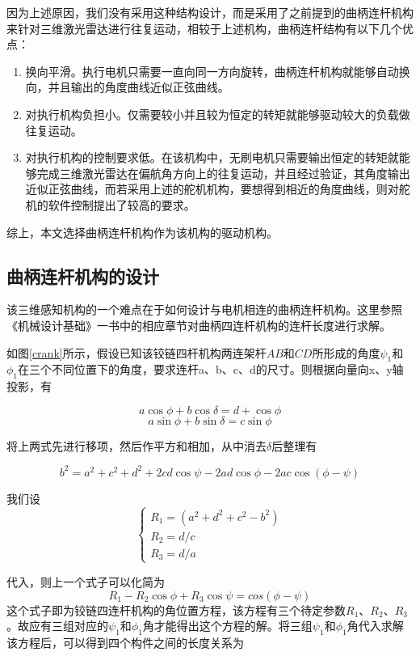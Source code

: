 因为上述原因，我们没有采用这种结构设计，而是采用了之前提到的曲柄连杆机构来针对三维激光雷达进行往复运动，相较于上述机构，曲柄连杆结构有以下几个优点：
\begin{enumerate}
    \item 换向平滑。执行电机只需要一直向同一方向旋转，曲柄连杆机构就能够自动换向，并且输出的角度曲线近似正弦曲线。
    \item 对执行机构负担小。仅需要较小并且较为恒定的转矩就能够驱动较大的负载做往复运动。
    \item 对执行机构的控制要求低。在该机构中，无刷电机只需要输出恒定的转矩就能够完成三维激光雷达在偏航角方向上的往复运动，并且经过验证，其角度输出近似正弦曲线，而若采用上述的舵机机构，要想得到相近的角度曲线，则对舵机的软件控制提出了较高的要求。
\end{enumerate}

综上，本文选择曲柄连杆机构作为该机构的驱动机构。

\subsection{曲柄连杆机构的设计}
该三维感知机构的一个难点在于如何设计与电机相连的曲柄连杆机构。这里参照《机械设计基础》一书中的相应章节对曲柄四连杆机构的连杆长度进行求解。

如图\ref{crank}所示，假设已知该铰链四杆机构两连架杆$AB$和$CD$所形成的角度$\psi_1$和$\phi_1$在三个不同位置下的角度，要求连杆a、b、c、d的尺寸。则根据向量向x、y轴投影，有

$$a\cos\phi + b\cos\delta = d + \cos\phi$$
$$a\sin\phi + b\sin\delta = c\sin\phi$$

将上两式先进行移项，然后作平方和相加，从中消去$\delta$后整理有

$$b^2 = a^2 + c^2 + d^2 + 2cd\cos\psi -2ad\cos\phi -2ac\cos(\phi - \psi)$$

我们设
$$ 
\begin{cases}
R_1=(a^2 + d^2 + c^2 - b^2) \\
R_2=d/c \\
R_3=d/a
\end{cases}
$$

代入，则上一个式子可以化简为
$$ R_1-R_2\cos\phi + R_3\cos\psi=cos(\phi-\psi)$$
这个式子即为铰链四连杆机构的角位置方程，该方程有三个待定参数$R_1$、$R_2$、$R_3$。故应有三组对应的$\psi_1$和$\phi_1$角才能得出这个方程的解。将三组$\psi_1$和$\phi_1$角代入求解该方程后，可以得到四个构件之间的长度关系为

